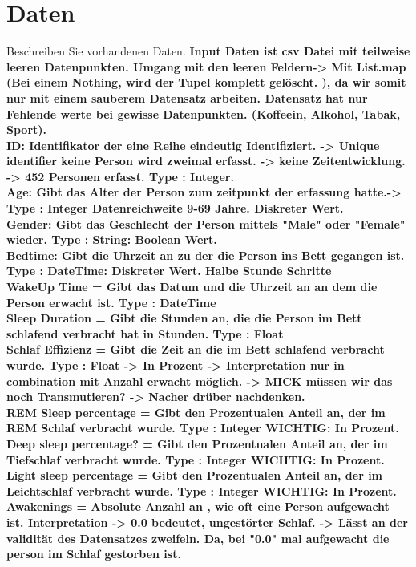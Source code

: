 \documentclass[usegeometry=true]{scrartcl}
\begin{document}
\section{Daten}
Beschreiben Sie vorhandenen Daten. 
\textbf{Input Daten ist csv Datei mit teilweise leeren Datenpunkten. Umgang mit den leeren Feldern-> Mit List.map (Bei einem Nothing, wird der Tupel komplett gelöscht. ), da wir somit nur mit einem sauberem Datensatz arbeiten. Datensatz hat nur Fehlende werte bei gewisse Datenpunkten. (Koffeein, Alkohol, Tabak, Sport).
\\ ID\@ : Identifikator der eine Reihe eindeutig Identifiziert. -> Unique identifier keine Person wird zweimal erfasst. -> keine Zeitentwicklung. -> 452 Personen erfasst. Type : Integer.
\\ Age: Gibt das Alter der Person zum zeitpunkt der erfassung hatte.-> Type : Integer   Datenreichweite 9-69 Jahre. Diskreter Wert.
\\ Gender: Gibt das Geschlecht der Person mittels "Male" oder "Female" wieder. Type : String: Boolean Wert.
\\ Bedtime: Gibt die Uhrzeit an zu der die Person ins Bett gegangen ist. Type : DateTime: Diskreter Wert. Halbe Stunde Schritte
\\ WakeUp Time = Gibt das Datum und die Uhrzeit an an dem die Person erwacht ist.  Type : DateTime
\\ Sleep Duration = Gibt die Stunden an, die die Person im Bett schlafend verbracht hat in Stunden. Type : Float 
\\  Schlaf Effizienz = Gibt die Zeit an die im Bett schlafend verbracht wurde. Type : Float -> In Prozent -> Interpretation nur in combination mit Anzahl erwacht möglich. -> MICK müssen wir das noch Transmutieren? -> Nacher drüber nachdenken.
\\ REM Sleep percentage = Gibt den Prozentualen Anteil an, der im REM Schlaf verbracht wurde. Type : Integer WICHTIG: In Prozent. 
\\ Deep sleep percentage? = Gibt den Prozentualen Anteil an, der im Tiefschlaf verbracht wurde. Type : Integer WICHTIG: In Prozent.
\\ Light sleep percentage = Gibt den Prozentualen Anteil an, der im Leichtschlaf verbracht wurde. Type : Integer WICHTIG: In Prozent.
\\ Awakenings = Absolute Anzahl an , wie oft eine Person aufgewacht ist. Interpretation -> 0.0 bedeutet, ungestörter Schlaf. -> Lässt an der validität des Datensatzes zweifeln. Da, bei "0.0" mal aufgewacht die person im Schlaf gestorben ist.
}
\end{document}
